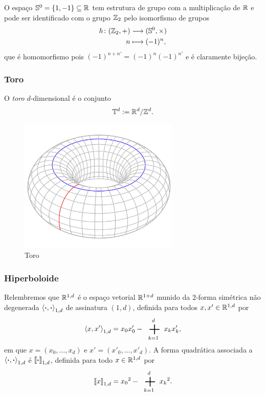 O espaço $\mathbb{S}^0 = \{1,-1\} \subseteq \mathbb{R}$ tem estrutura de grupo com a multiplicação de $\mathbb{R}$ e pode ser identificado com o grupo $\mathbb{Z}_2$ pelo isomorfismo de grupos
	\begin{align*}
	{h}\colon {(\mathbb{Z}_2,+)} &\longrightarrow {(\mathbb{S}^0,\times)} \\{n} &\longmapsto (-1)^n,
	\end{align*}
que é homomorfismo pois $(-1)^{n+n'} = (-1)^n(-1)^{n'}$ e é claramente bijeção.

\subsubsection{Toro}

\begin{definition}
	O \emph{toro} $d$-dimensional é o conjunto
	\begin{equation*}
	\mathbb{T}^d := \mathbb{R}^d / \mathbb{Z}^d.
	\end{equation*}
\end{definition}

\begin{figure}
\centering
\includegraphics[width=3in]{./imagens/toro}
\caption{Toro}
\end{figure}

\subsubsection{Hiperboloide}

Relembremos que $\mathbb{R}^{1,d}$ é o espaço vetorial $\mathbb{R}^{1+d}$ munido da $2$-forma simétrica não degenerada $\left\langle{\bm{\cdot}},{\bm{\cdot}}\right\rangle_{1,d}$ de assinatura $(1,d)$, definida para todos $x,x' \in \mathbb{R}^{1,d}$ por
	\begin{equation*}
	\inte{x}{x'}_{1,d} = x_0x'_0 - \sum_{k=1}^{d} x_k x'_k,
	\end{equation*}
em que $x = (x_0,\ldots,x_d)$ e $x' = (x'_0,\ldots,x'_d)$. A forma quadrática associada a $\left\langle{\bm{\cdot}},{\bm{\cdot}}\right\rangle_{1,d}$ é $\left\llbracket{\bm{\cdot}}\right\rrbracket_{1,d}$, definida para todo $x \in \mathbb{R}^{1,d}$ por
	\begin{equation*}
	\qua{x}_{1,d} = {x_0}^2 - \sum_{k=1}^{d} {x_k}^2.
	\end{equation*}

